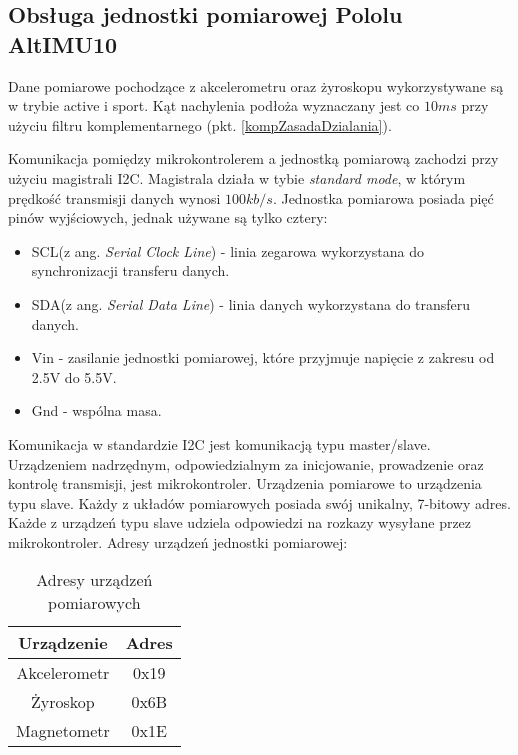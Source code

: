 \subsection{Obsługa jednostki pomiarowej Pololu AltIMU10}
Dane pomiarowe pochodzące z akcelerometru oraz żyroskopu wykorzystywane są w trybie active i sport. Kąt nachylenia podłoża wyznaczany jest co $10ms$ przy użyciu filtru komplementarnego (pkt. \ref{kompZasadaDzialania}). 
 
Komunikacja pomiędzy mikrokontrolerem a jednostką pomiarową zachodzi przy użyciu magistrali I2C. Magistrala działa w tybie \textit{standard mode}, w którym prędkość transmisji danych wynosi $100kb/s$. Jednostka pomiarowa posiada pięć pinów wyjściowych, jednak używane są tylko cztery:
\begin{itemize}
    \item
    SCL(z ang. {\em Serial Clock Line}) - linia zegarowa wykorzystana do synchronizacji transferu danych.
    \item
    SDA(z ang. {\em Serial Data Line}) - linia danych wykorzystana do transferu danych.
    \item
    Vin - zasilanie jednostki pomiarowej, które przyjmuje napięcie z zakresu od 2.5V do 5.5V.
    \item
    Gnd - wspólna masa.
\end{itemize} 

Komunikacja w standardzie I2C jest komunikacją typu master/slave. Urządzeniem nadrzędnym, odpowiedzialnym za inicjowanie, prowadzenie oraz kontrolę transmisji, jest mikrokontroler. Urządzenia pomiarowe to urządzenia typu slave. Każdy z układów pomiarowych posiada swój unikalny, 7-bitowy adres. Każde z urządzeń typu slave udziela odpowiedzi na rozkazy wysyłane przez mikrokontroler. Adresy urządzeń jednostki pomiarowej:

\begin{table}[h]
    \caption{Adresy urządzeń pomiarowych}
    \begin{center}
		\label{tab:adresyImu}
		\begin{tabular}{|c|c|}
			\hline
 			\textbf{Urządzenie} & \textbf{Adres} \\
 			\hline
 			Akcelerometr & 0x19 \\  
 			\hline
			Żyroskop & 0x6B \\
			\hline
			Magnetometr & 0x1E \\  
			\hline
		\end{tabular}
	\end{center}
\end{table}

